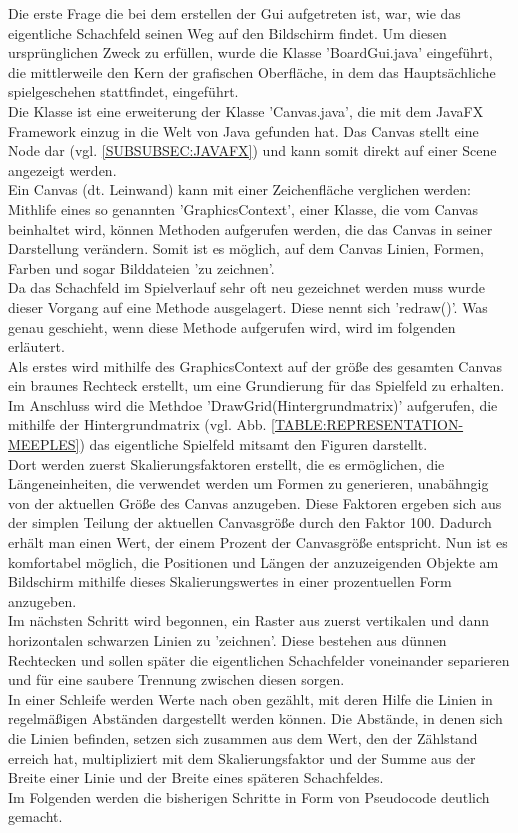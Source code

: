 \documentclass[12pt,a4paper]{article}
\begin{document}
{Die erste Frage die bei dem erstellen der Gui aufgetreten ist, war, wie das eigentliche Schachfeld seinen Weg auf den Bildschirm findet. 
Um diesen ursprünglichen Zweck zu erfüllen, wurde die Klasse 'BoardGui.java' eingeführt, die mittlerweile den Kern der grafischen Oberfläche, in dem das Hauptsächliche spielgeschehen stattfindet, eingeführt. \\
Die Klasse ist eine erweiterung der Klasse 'Canvas.java', die mit dem JavaFX Framework einzug in die Welt von Java gefunden hat. Das Canvas stellt eine Node dar (vgl.  \ref{SUBSUBSEC:JAVAFX}) und kann somit direkt auf einer Scene angezeigt werden.\\
Ein Canvas (dt. Leinwand) kann mit einer Zeichenfläche verglichen werden: Mithlife eines so genannten 'GraphicsContext', einer Klasse, die vom Canvas beinhaltet wird, können Methoden aufgerufen werden, die das Canvas in seiner Darstellung verändern. Somit ist es möglich, auf dem Canvas Linien, Formen, Farben und sogar Bilddateien 'zu zeichnen'. \\
Da das Schachfeld im Spielverlauf sehr oft neu gezeichnet werden muss wurde dieser Vorgang auf eine Methode ausgelagert. Diese nennt sich 'redraw()'. Was genau geschieht, wenn diese Methode aufgerufen wird, wird im folgenden erläutert. \\[2ex]
Als erstes wird mithilfe des GraphicsContext auf der größe des gesamten Canvas ein braunes Rechteck erstellt, um eine Grundierung für das Spielfeld zu erhalten. 
Im Anschluss wird die Methdoe 'DrawGrid(Hintergrundmatrix)' aufgerufen, die mithilfe der Hintergrundmatrix (vgl. Abb. \ref{TABLE:REPRESENTATION-MEEPLES}) das eigentliche Spielfeld mitsamt den Figuren darstellt.\\ 
Dort werden zuerst Skalierungsfaktoren erstellt, die es ermöglichen, die Längeneinheiten, die verwendet werden um Formen zu generieren, unabähngig von der aktuellen Größe des Canvas anzugeben. Diese Faktoren ergeben sich aus der simplen Teilung der aktuellen Canvasgröße durch den Faktor 100. Dadurch erhält man einen Wert, der einem Prozent der Canvasgröße entspricht. Nun ist es komfortabel möglich, die Positionen und Längen der anzuzeigenden Objekte am Bildschirm mithilfe dieses Skalierungswertes in einer prozentuellen Form anzugeben.\\
Im nächsten Schritt wird begonnen, ein Raster aus zuerst vertikalen und dann horizontalen schwarzen Linien zu 'zeichnen'. Diese bestehen aus dünnen Rechtecken und sollen später die eigentlichen Schachfelder voneinander separieren und für eine saubere Trennung zwischen diesen sorgen.\\
In einer Schleife werden Werte nach oben gezählt, mit deren Hilfe die Linien in regelmäßigen Abständen dargestellt werden können. Die Abstände, in denen sich die Linien befinden, setzen sich zusammen aus dem Wert, den der Zählstand erreich hat, multipliziert mit dem Skalierungsfaktor und der Summe aus der Breite einer Linie und der Breite eines späteren Schachfeldes.\\
Im Folgenden werden die bisherigen Schritte in Form von Pseudocode deutlich gemacht.\\
\lstset{language=java}
\begin{lstlisting}


\end{lstlisting}}
\end{document}
